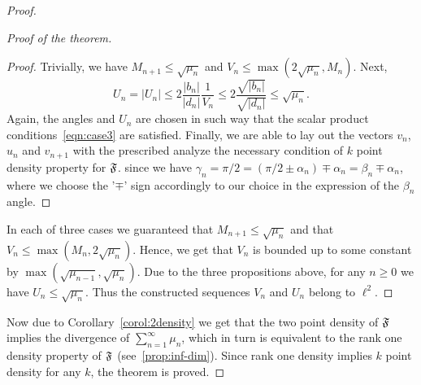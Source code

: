 \begin{proof}
\begin{proof}[Proof of the theorem]
\begin{proof}
            Trivially, we have $M_{n+1} \leq \sqrt{\mu_n}$ and $V_n \leq \max(2\sqrt{\mu_n}, M_n)$.
            Next,
            \[
              U_n = |U_n| \leq 2 \frac{|b_n|}{|d_n|} \frac{1}{V_n} \leq 2 \frac{\sqrt{|b_n|}}{\sqrt{|d_n|}} \leq \sqrt{\mu_n}.
            \]
            Again, the angles and $U_n$ are chosen in such way that the scalar product conditions~\eqref{eqn:case3} are satisfied.
            Finally, we are able to lay out the vectors $v_n$, $u_n$ and $v_{n+1}$ with the prescribed  analyze the necessary condition of $k$ point density property for $\mathfrak{F}$.
              since we have $\gamma_n = \pi/2 = (\pi/2 \pm \alpha_n) \mp \alpha_n = \beta_n \mp \alpha_n$,
              where we choose the '$\mp$' sign accordingly to our choice in the expression of the $\beta_n$ angle.
          \end{proof}
        In each of three cases we guaranteed that $M_{n+1} \leq \sqrt{\mu_n}$ and that $V_n \leq \max(M_n, 2\sqrt{\mu_n})$.
        Hence, we get that $V_n$ is bounded up to some constant by $\max(\sqrt{\mu_{n-1}}, \sqrt{\mu_n})$.
        Due to the three propositions above, for any $n \geq 0$ we have $U_n \leq \sqrt{\mu_n}$.
        Thus the constructed sequences $V_n$ and $U_n$ belong to $\ell^2$.
      \end{proof}
      Now due to Corollary~\ref{corol:2density} we get that the two point density of $\mathfrak{F}$ implies the divergence of $\sum_{n=1}^\infty \mu_n$,
        which in turn is equivalent to the rank one density property of $\mathfrak{F}$ (see~\ref{prop:inf-dim}).
      Since rank one density implies $k$ point density for any $k$, the theorem is proved.
    \end{proof}
